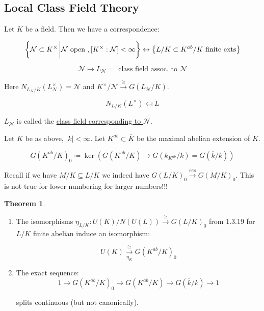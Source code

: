 \documentclass{article}
\theoremstyle{definition}
\newtheorem{theorem}{Theorem}
\numberwithin{theorem}{subsection}
\begin{document}
    \subsection*{Local Class Field Theory}

    Let \(K\) be a field. Then we have a correspondence:

    \[
        \left\{ \mathcal{N} \subset K^\times \eval \mathcal{N} \text{ open }, [K^\times : \mathcal{N}] < \infty \right\} \leftrightarrow \left\{ L / K \subset K^{ab} / K \text{ finite exts}  \right\} 
    \]

    \[
        \mathcal{N}  \mapsto L_{\mathcal{N}} = \text{ class field assoc. to } \mathcal{N}
    \]

    Here \(N_{L_{\mathcal{N}} / K}(L_{\mathcal{N}}^\times) = \mathcal{N}\) and \(K^\times / \mathcal{N} \xrightarrow{\cong} G(L_{\mathcal{N}} / K)\).
    
    \[
        N_{L / K}(L^\times) \mapsfrom L
    \] 

    \(L_{\mathcal{N}}\) is called the \underline{class field corresponding to \(\mathcal{N}\)}.

    Let \(K\) be as above, \(\vert k \vert < \infty\). Let \(K^{ab} \subset \overline{K}\) be the maximal abelian extension of \(K\).

    \[
        G(K^{ab} / K)_0 \coloneqq \ker (G(K^{ab} / K) \to G(k_{K^{ab}} / k) = G(\overline{k} / k))
    \]

    Recall if we have \(M / K \subseteq L / K\) we indeed have \(G(L / K)_0 \xrightarrow{res} G(M / K)_0\). This is not true for lower numbering for larger numbers!!!

    \begin{theorem}

        \begin{enumerate}[label=\roman*)]
            \item The isomorphisms \(\eta_{L / K}: U(K) / N(U(L)) \xrightarrow{\cong} G(L / K)_0\) from 1.3.19 for \(L / K\) finite abelian induce an isomorphism:

            \[
                U(K) \xrightarrow[\eta_K]{\cong} G(K^{ab} / K)_0
            \]

            \item The exact sequence:
            \[
                1 \to G(K^{ab} / K)_0 \to G(K^{ab} / K) \to G(\overline{k} / k) \to 1
            \]

            splits continuous (but not canonically).

        \end{enumerate}

    \end{theorem}
\end{document}
